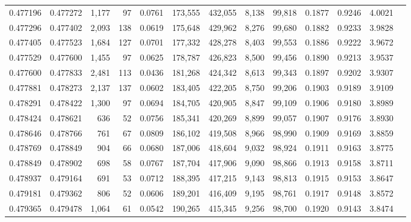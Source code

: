 \begin{tabular}{rrrrrrrrrrrrr}
0.477196 & 0.477272 & 1,177 &    97 &                                     0.0761 & 173,555 & 432,055 &   8,138 &  99,818 & 0.1877 & 0.9246 & 4.0021 \\
0.477296 & 0.477402 & 2,093 &   138 &                                     0.0619 & 175,648 & 429,962 &   8,276 &  99,680 & 0.1882 & 0.9233 & 3.9828 \\
0.477405 & 0.477523 & 1,684 &   127 &                                     0.0701 & 177,332 & 428,278 &   8,403 &  99,553 & 0.1886 & 0.9222 & 3.9672 \\
0.477529 & 0.477600 & 1,455 &    97 &                                     0.0625 & 178,787 & 426,823 &   8,500 &  99,456 & 0.1890 & 0.9213 & 3.9537 \\
0.477600 & 0.477833 & 2,481 &   113 &                                     0.0436 & 181,268 & 424,342 &   8,613 &  99,343 & 0.1897 & 0.9202 & 3.9307 \\
0.477881 & 0.478273 & 2,137 &   137 &                                     0.0602 & 183,405 & 422,205 &   8,750 &  99,206 & 0.1903 & 0.9189 & 3.9109 \\
0.478291 & 0.478422 & 1,300 &    97 &                                     0.0694 & 184,705 & 420,905 &   8,847 &  99,109 & 0.1906 & 0.9180 & 3.8989 \\
0.478424 & 0.478621 &   636 &    52 &                                     0.0756 & 185,341 & 420,269 &   8,899 &  99,057 & 0.1907 & 0.9176 & 3.8930 \\
0.478646 & 0.478766 &   761 &    67 &                                     0.0809 & 186,102 & 419,508 &   8,966 &  98,990 & 0.1909 & 0.9169 & 3.8859 \\
0.478769 & 0.478849 &   904 &    66 &                                     0.0680 & 187,006 & 418,604 &   9,032 &  98,924 & 0.1911 & 0.9163 & 3.8775 \\
0.478849 & 0.478902 &   698 &    58 &                                     0.0767 & 187,704 & 417,906 &   9,090 &  98,866 & 0.1913 & 0.9158 & 3.8711 \\
0.478937 & 0.479164 &   691 &    53 &                                     0.0712 & 188,395 & 417,215 &   9,143 &  98,813 & 0.1915 & 0.9153 & 3.8647 \\
0.479181 & 0.479362 &   806 &    52 &                                     0.0606 & 189,201 & 416,409 &   9,195 &  98,761 & 0.1917 & 0.9148 & 3.8572 \\
0.479365 & 0.479478 & 1,064 &    61 &                                     0.0542 & 190,265 & 415,345 &   9,256 &  98,700 & 0.1920 & 0.9143 & 3.8474 \\

\end{tabular}
